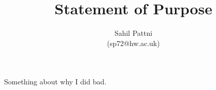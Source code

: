 \documentclass[a4paper,11pt]{article}
\begin{document}
\title{Statement of Purpose}

\author{Sahil Pattni\\(sp72@hw.ac.uk)}
\date{}
\maketitle

Something about why I did bad.

\end{document}
